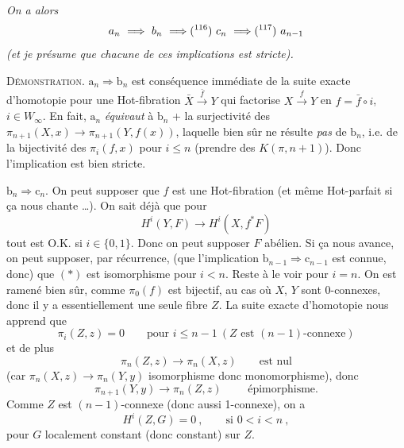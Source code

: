 \documentclass[11pt]{article}
\newcommand{\printedpage}[1]{{\reversemarginpar\marginnote{\raggedleft\scriptsize ed.~#1}}}
\newcommand{\msp}[1]{\marginpar{\raggedright\scriptsize ms.~#1}}
\begin{document}
\textit{On a alors}
\[
a_n \ \Longrightarrow\ b_n \ \Longrightarrow \text{(\footnotemark[116])}\ c_n \ \Longrightarrow \text{(\footnotemark[117])}\ a_{n-1}
\]
%
%
\textit{(et je présume que chacune de ces implications est stricte).}

\textsc{Démonstration}. $\mathrm{a}_n \Longrightarrow \mathrm{b}_n$ est conséquence immédiate de la suite exacte d'homotopie pour une Hot-fibration $\bar{X} \xrightarrow{\bar{f}} Y$ qui factorise $X \xrightarrow{f} Y$ en $f = \bar{f} \circ i$, $i \in W_\infty$. En fait, $\mathrm{a}_n$ \textit{équivaut} à $\mathrm{b}_n$ + la surjectivité des $\pi_{n+1}(X,x) \longrightarrow \pi_{n+1}(Y,f(x))$, laquelle bien sûr ne résulte \textit{pas} de $\mathrm{b}_n$, i.e. de la bijectivité des $\pi_i(f,x)$ pour $i \leq n$ (prendre des $K(\pi,n+1)$). Donc l'implication est bien stricte.

\printedpage{120}

\msp{page 180}
$\mathrm{b}_n \Longrightarrow \mathrm{c}_n$. On peut supposer que $f$ est une Hot-fibration (et même Hot-parfait si ça nous chante \dots). On sait déjà que pour
\[
H^i(Y,F) \longrightarrow H^i(X,f^*F) \tag*{$(*)$}
\]
tout est O.K. si $i \in \{0,1\}$. Donc on peut supposer $F$ abélien. Si ça nous avance, on peut supposer, par récurrence, (que l’implication $\mathrm{b}_{n-1} \Longrightarrow \mathrm{c}_{n-1}$ est connue, donc) que $(*)$ est isomorphisme pour $i<n$. Reste à le voir pour $i=n$. On est ramené bien sûr, comme $\pi_0(f)$ est bijectif, au cas où $X$, $Y$ sont 0-connexes, donc il y a essentiellement une seule fibre $Z$. La suite exacte d’homotopie nous apprend que
\[
\pi_i(Z,z)=0 \qquad \text{pour } i \le n-1 \ (Z \text{ est } (n-1)\text{-connexe})
\]
et de plus
\[
\pi_n(Z,z) \longrightarrow \pi_n(X,z) \qquad \text{est nul}
\]
(car $\pi_n(X,z) \longrightarrow \pi_n(Y,y)$ isomorphisme donc monomorphisme), donc
\[
\pi_{n+1}(Y,y) \longrightarrow \pi_n(Z,z) \qquad \text{ épimorphisme.}
\]
Comme $Z$ est $(n-1)$-connexe (donc aussi 1-connexe), on a
\[
H^i(Z,G)=0\ , \qquad \text{si } 0<i<n\ , \tag*{$(*)$}
\]
pour $G$ localement constant (donc constant) sur $Z$.
\end{document}
